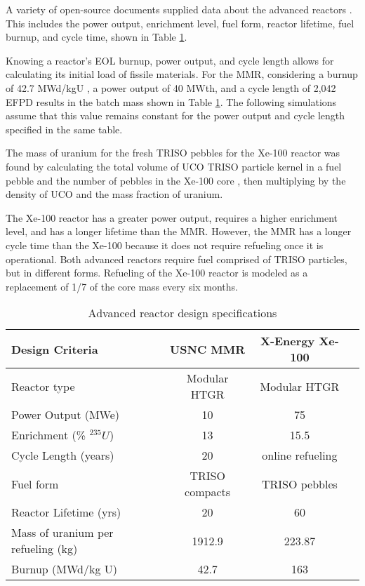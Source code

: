 A variety of open-source documents supplied data about the advanced reactors
\cite{mitchell_usnc_2020, hawari_development_2018, venneri_neutronic_2015, 
harlan_x-energy_2018, hussain_advances_2018}. 
This includes 
the power output, enrichment level, fuel form, reactor lifetime, fuel 
burnup, and cycle time, shown in Table \ref{tab:reactor_summary}. 

Knowing a reactor's \gls{EOL} burnup, power output, and cycle length
allows for calculating its initial load of fissile materials.
For the \gls{MMR}, considering a burnup of 42.7 MWd/kgU 
\cite{hawari_development_2018},
a power output of 40 MWth, and a cycle length of 2,042 \gls{EFPD} 
\cite{venneri_neutronic_2015}
results in the batch mass shown in Table \ref{tab:reactor_summary}.
The following simulations assume that this value remains constant for the
power output and cycle length specified in the same table.

The mass of uranium for the fresh \gls{TRISO} pebbles for the Xe-100 
reactor was found by calculating the total volume of UCO \gls{TRISO} 
particle kernel in a fuel pebble and the number of 
pebbles in the Xe-100 core \cite{harlan_x-energy_2018}, then 
multiplying by the density of UCO and the mass fraction of uranium. 

The Xe-100 reactor has a greater power output, requires a higher enrichment 
level, and has a longer lifetime than the \gls{MMR}. However, the 
\gls{MMR} has a longer cycle time than the Xe-100 because it does not require 
refueling once it is operational. Both advanced reactors require fuel 
comprised of \gls{TRISO} particles, but in different forms. Refueling 
of the Xe-100 reactor is modeled as a replacement of 1/7 of the core mass 
every six months.  

\begin{table}[ht]
        \caption{Advanced reactor design specifications}
        \label{tab:reactor_summary}
        \begin{tabular}{l c c c }
            \hline
            Design Criteria & \gls{USNC} \gls{MMR} \cite{mitchell_usnc_2020}& 
                X-Energy Xe-100 \cite{harlan_x-energy_2018,hussain_advances_2018} \\\hline
            Reactor type & Modular HTGR & Modular HTGR \\
            Power Output (MWe) & 10 & 75 \\
            Enrichment (\% $^{235}U$) & 13 & 15.5 \\
            Cycle Length (years) & 20 & online refueling\\
            Fuel form & \gls{TRISO} compacts & \gls{TRISO} pebbles\\
            Reactor Lifetime (yrs) & 20 & 60 \\
            Mass of uranium per refueling (kg) & 1912.9 & 223.87 \\
            Burnup (MWd/kg U) & 42.7 & 163 \\
            \hline
        \end{tabular}
    \end{table}

